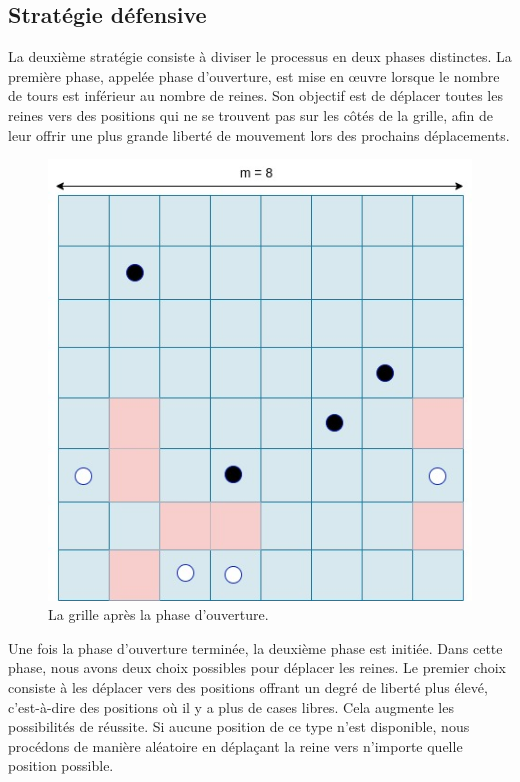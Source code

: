 \documentclass[11pt]{article}
\begin{document}
        \subsection{Stratégie défensive}
        La deuxième stratégie consiste à diviser le processus en deux phases distinctes. La première phase, appelée phase d'ouverture, est mise en œuvre lorsque le nombre de tours est inférieur au nombre de reines. Son objectif est de déplacer toutes les reines vers des positions qui ne se trouvent pas sur les côtés de la grille, afin de leur offrir une plus grande liberté de mouvement lors des prochains déplacements.
         \begin{figure}[h]
                \centering
                \includegraphics[scale=0.3]{strategy_oppening.jpeg}
                \caption{La grille après la phase d'ouverture.}
                \label{fig:opening}
            \end{figure}

Une fois la phase d'ouverture terminée, la deuxième phase est initiée. Dans cette phase, nous avons deux choix possibles pour déplacer les reines. Le premier choix consiste à les déplacer vers des positions offrant un degré de liberté plus élevé, c'est-à-dire des positions où il y a plus de cases libres. Cela augmente les possibilités de réussite. Si aucune position de ce type n'est disponible, nous procédons de manière aléatoire en déplaçant la reine vers n'importe quelle position possible.
\end{document}
